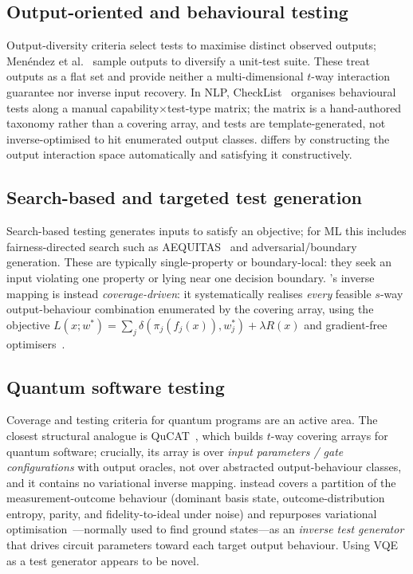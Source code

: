\subsection{Output-oriented and behavioural testing}
Output-diversity criteria select tests to maximise distinct observed outputs;
Men\'endez et al.~\cite{menendez2022output} sample outputs to diversify a unit-test
suite. These treat outputs as a flat set and provide neither a multi-dimensional
$t$-way interaction guarantee nor inverse input recovery. In NLP,
CheckList~\cite{ribeiro2020checklist} organises behavioural tests along a manual
capability$\times$test-type matrix; the matrix is a hand-authored taxonomy rather
than a covering array, and tests are template-generated, not inverse-optimised to
hit enumerated output classes. \rnwise{} differs by constructing the output
interaction space automatically and satisfying it constructively.

\subsection{Search-based and targeted test generation}
Search-based testing generates inputs to satisfy an objective; for ML this
includes fairness-directed search such as AEQUITAS~\cite{udeshi2018aequitas} and
adversarial/boundary generation. These are typically single-property or
boundary-local: they seek an input violating one property or lying near one
decision boundary. \rnwise{}'s inverse mapping is instead \emph{coverage-driven}:
it systematically realises \emph{every} feasible $s$-way output-behaviour
combination enumerated by the covering array, using the objective
$L(x;w^{*}) = \sum_j \delta(\pi_j(f_j(x)), w^{*}_j) + \lambda R(x)$ and gradient-free
optimisers~\cite{rao2016jaya,mirjalili2016whale,yang2009firefly}.

\subsection{Quantum software testing}
Coverage and testing criteria for quantum programs are an active area. The
closest structural analogue is QuCAT~\cite{wang2023qucat}, which builds $t$-way
covering arrays for quantum software; crucially, its array is over \emph{input
parameters / gate configurations} with output oracles, not over abstracted
output-behaviour classes, and it contains no variational inverse mapping. \rnwise{}
instead covers a partition of the measurement-outcome behaviour (dominant basis
state, outcome-distribution entropy, parity, and fidelity-to-ideal under noise)
and repurposes variational optimisation~\cite{peruzzo2014vqe}---normally used to
find ground states---as an \emph{inverse test generator} that drives circuit
parameters toward each target output behaviour. Using VQE as a test generator
appears to be novel.
